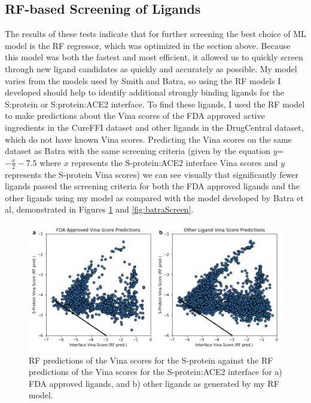 \documentclass[11pt]{article}
\begin{document}
   \subsection{RF-based Screening of Ligands}
   The results of these tests indicate that for further screening the best choice of ML model is the RF regressor, which was optimized in the section above. Because this model was both the fastest and most efficient, it allowed us to quickly screen through new ligand candidates as quickly and accurately as possible. My model varies from the models used by Smith and Batra, so using the RF models I developed should help to identify additional strongly binding ligands for the S:protein or S:protein:ACE2 interface. To find these  ligands, I used the RF model to make predictions about the Vina scores of the FDA approved active ingredients in the CureFFI dataset and other ligands in the DrugCentral dataset, which do not have known Vina scores. Predicting the Vina scores on the same dataset as Batra with the same screening criteria (given by the equation $y$=$-\frac{x}{2} - 7.5$ where $x$ represents the S-protein:ACE2 interface Vina scores and $y$ represents the S-protein Vina scores) we can see visually that significantly fewer ligands passed the screening criteria for both the FDA approved ligands and the other ligands using my model as compared with the model developed by Batra et al, demonstrated in Figures \ref{fig:myScreen} and \ref{fig:batraScreen}.
   
   \begin{figure}
     \centering
     \includegraphics[width=120mm]{myscreening}
     \caption{RF predictions of the Vina scores for the S-protein against the RF predictions of the Vina scores for the S-protein:ACE2 interface for a) FDA approved ligands, and b) other ligands as generated by my RF model.}
     \label{fig:myScreen}
   \end{figure} 
\end{document}
